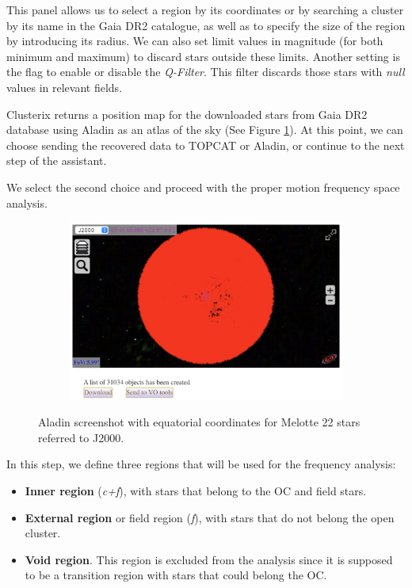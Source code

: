 \documentclass[11pt, a4paper, english]{book}
\begin{document}
This panel allows us to select a region by its coordinates
or by searching a cluster by its name in the Gaia DR2 catalogue,
as well as to specify the size of the region by introducing its radius.
We can also set limit values in magnitude (for both minimum and maximum)
to discard stars outside these limits.
Another setting is the flag to enable or disable the \emph{Q-Filter}.
This filter discards those stars with \emph{null} values in relevant fields.

Clusterix returns a position map for the downloaded stars from Gaia DR2 database
using Aladin \cite{bonnarel2000aladin} as an atlas of the sky (See Figure \ref{fig:aladin_melotte_22}).
At this point, we can choose sending the recovered data to TOPCAT or Aladin,
or continue to the next step of the assistant.

We select the second choice and proceed with the proper motion frequency space analysis.

\begin{figure}[htbp]
  \centering
  \begin{subfigure}{0.9\textwidth}
    \centering
    \includegraphics[width=\textwidth]{../figures/clusterix/clusterix_aladin_selection_melotte_22.png}
  \end{subfigure}
  \caption{Aladin screenshot with equatorial coordinates for Melotte 22 stars referred to J2000.}
  \label{fig:aladin_melotte_22}
\end{figure}

In this step, we define three regions that will be used for the frequency analysis:

\begin{itemize}
  \item \textbf{Inner region} (\emph{c+f}), with stars that belong to the OC and field stars.
  \item \textbf{External region} or field region (\emph{f}), with stars that do not belong the open cluster.
  \item \textbf{Void region}. This region is excluded from the analysis since it is supposed
                to be a transition region with stars that could belong the OC.
\end{itemize}
\end{document}
